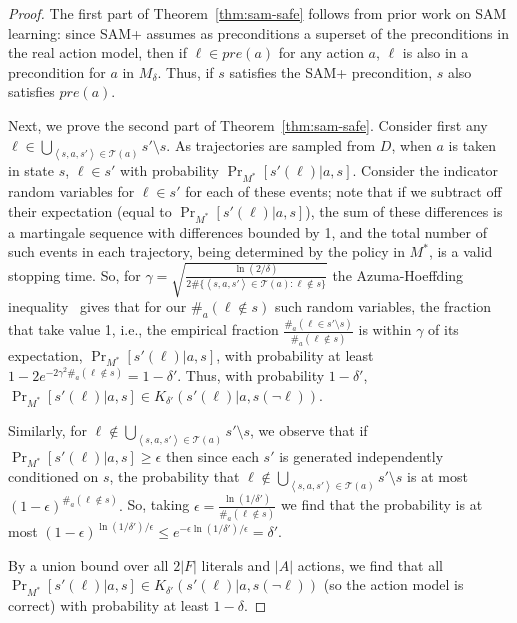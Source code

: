 \documentclass[letterpaper]{article} %
\newcommand{\pre}{\textit{pre}}
\newcommand{\tuple}[1]{\ensuremath{\left \langle #1 \right \rangle }}
\begin{document}
\begin{proof}
The first part of Theorem~\ref{thm:sam-safe} follows from prior work on SAM learning: since SAM+ assumes as preconditions a superset of the preconditions in the real action model, then if $\ell\in\pre(a)$ for any action $a$, $\ell$ is also in a precondition for $a$ in $M_\delta$. %
Thus, if $s$ satisfies the SAM+ precondition, $s$ also satisfies $\pre(a)$.

Next, we prove the second part of Theorem~\ref{thm:sam-safe}. 
Consider first any $\ell\in\bigcup_{\tuple{s, a, s'}\in \mathcal{T}(a)} s'\setminus s $. 
As trajectories are sampled from $D$, when $a$ is taken in state $s$, $\ell\in s'$ with probability $\Pr_{M^*}[s'(\ell)|a,s]$. 
Consider the indicator random variables for $\ell\in s'$ for each of these events; note that if we subtract off their expectation (equal to $\Pr_{M^*}[s'(\ell)|a,s]$), the sum of these differences is a martingale sequence with differences bounded by 1, and the total number of such events in each trajectory, being determined by the policy in $M^*$, is a valid stopping time. 
So, for 
$
\gamma = \sqrt{\frac{\ln(2/\delta)}{2\#\{\tuple{s, a, s'}\in \mathcal{T}(a):\ell\notin s\}}}
$
the Azuma-Hoeffding inequality~\cite{hoeffding1963probability} gives that for our 
$\#_a(\ell\notin s)$ 
such random variables, the fraction that take value 1, i.e., the empirical fraction
$
\frac{\#_a(\ell\in s'\setminus s)}{\#_a(\ell \notin s)}
$
is within $\gamma$ of its expectation, $\Pr_{M^*}[s'(\ell)|a,s]$, with probability at least %
$1-2e^{-2\gamma^2\#_a(\ell \notin s)}=1-\delta'$. 
Thus, with probability $1-\delta'$, $\Pr_{M^*}[s'(\ell)|a,s]\in K_{\delta'}(s'(\ell)|a,s(\neg\ell))$. 

Similarly, for $\ell\notin\bigcup_{\tuple{s, a, s'}\in \mathcal{T}(a)} s'\setminus s$, we observe that if 
$\Pr_{M^*}[s'(\ell)|a,s]\geq \epsilon$
then since each $s'$ is generated independently conditioned on $s$, the probability that $\ell\notin\bigcup_{\tuple{s, a, s'}\in \mathcal{T}(a)} s'\setminus s$ is at most
$
(1-\epsilon)^{\#_a(\ell\notin s)}.
$
So, taking
$
\epsilon = \frac{\ln(1/\delta')}{\#_a(\ell\notin s)}
$
we find that the probability is at most
$
(1-\epsilon)^{\ln(1/\delta')/\epsilon}
\leq e^{-\epsilon \ln(1/\delta')/\epsilon}
=\delta'.
$

By a union bound over all $2|F|$ literals and $|A|$ actions, we find that all $\Pr_{M^*}[s'(\ell)|a,s]\in K_{\delta'}(s'(\ell)|a,s(\neg\ell))$ (so the action model is correct) with probability at least $1-\delta$. %
\end{proof}
\end{document}
